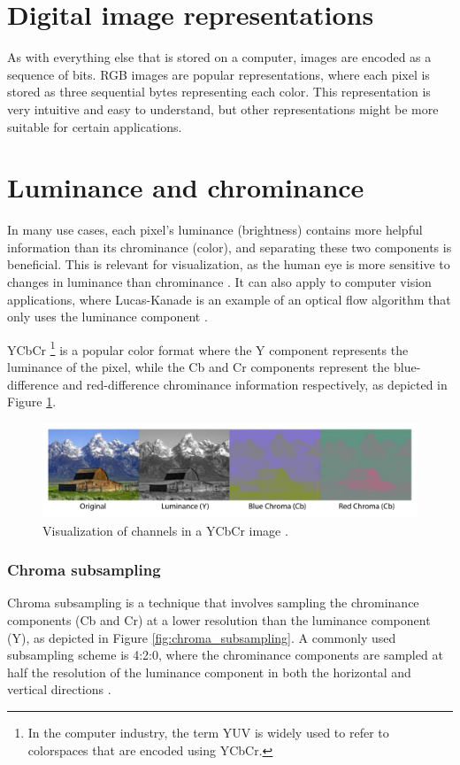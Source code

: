 \section{Digital image representations}
As with everything else that is stored on a computer, images are encoded as a sequence of bits.
RGB images are popular representations, where each pixel is stored as three sequential bytes representing each color.
This representation is very intuitive and easy to understand, but other representations might be more suitable for certain applications.

\section{Luminance and chrominance}
In many use cases, each pixel's luminance (brightness) contains more helpful information than its chrominance (color), and separating these two components is beneficial.
This is relevant for visualization, as the human eye is more sensitive to changes in luminance than chrominance  \cite{lambWhyRodsCones2016}.
It can also apply to computer vision applications, where Lucas-Kanade is an example of an optical flow algorithm that only uses the luminance component \cite{lucasIterativeImageRegistration1981}.

YCbCr
\footnote{In the computer industry, the term YUV is widely used to refer to colorspaces that are encoded using YCbCr.}
is a popular color format where the Y component represents the luminance of the pixel, while the Cb and Cr components represent the blue-difference and red-difference chrominance information respectively, as depicted in Figure \ref{fig:ycbcr_example}.

\begin{figure}[H]
    \centering
    \includegraphics[width=\textwidth]{figures/debayer/YCbCr_example.pdf}
    \caption{Visualization of channels in a YCbCr image \cite{photoEnglishJohnMoulton2004}.}
    \label{fig:ycbcr_example}
\end{figure}

\subsubsection{Chroma subsampling}
Chroma subsampling is a technique that involves sampling the chrominance components (Cb and Cr) at a lower resolution than the luminance component (Y), as depicted in Figure \ref{fig:chroma_subsampling}.
A commonly used subsampling scheme is 4:2:0, where the chrominance components are sampled at half the resolution of the luminance component in both the horizontal and vertical directions \cite{ChromaSubsampling2023}.

